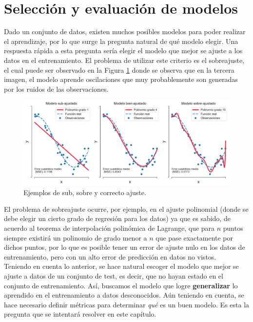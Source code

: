 
\section{Selección y evaluación de modelos}

Dado un conjunto de datos, existen muchos posibles modelos para poder realizar el aprendizaje, por lo que surge la pregunta natural de qué modelo elegir. Una respuesta rápida a esta pregunta sería elegir el modelo que mejor se ajuste a los datos en el entrenamiento. El problema de utilizar este criterio es el sobreajuste, el cual puede ser observado en la Figura \ref{fig:overfitting} donde se observa que en la tercera imagen, el modelo aprende oscilaciones que muy probablemente son generadas por los ruidos de las observaciones. 
\begin{figure}[h!]
    \centering
    \includegraphics[width = 0.9\linewidth]{img/cap4_ajuste.pdf}
    \caption{Ejemplos de sub, sobre y correcto ajuste.}
    \label{fig:overfitting}
\end{figure}

El problema de sobreajuste ocurre, por ejemplo, en el ajuste polinomial (donde se debe elegir un cierto grado de regresión para los datos) ya que es sabido, de acuerdo al teorema de interpolación polinómica de Lagrange, que para $n$ puntos siempre existirá un polinomio de grado menor a $n$ que pase exactamente por dichos puntos, por lo que es posible tener un error de ajuste nulo en los datos de entrenamiento, pero con un alto error de predicción en datos no vistos.\\

Teniendo en cuenta lo anterior, se hace natural escoger el modelo que mejor se ajuste a datos de un conjunto de test, es decir, que no hayan estado en el conjunto de entrenamiento. Así, buscamos el modelo que logre \textbf{generalizar} lo aprendido en el entrenamiento a datos desconocidos. Aún teniendo en cuenta, se hace necesario definir métricas para determinar \textit{qué} es un buen modelo. Es esta la pregunta que se intentará resolver en este capítulo.

